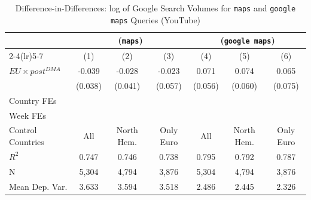 \documentclass[11pt]{article}
\begin{document}
	\begin{table}[!ht]
		\centering
		\def\sym#1{\ifmmode^{#1}\else\(^{#1}\)\fi}
		\caption{\label{tab:did_placebo} Difference-in-Differences: log of Google Search Volumes for \texttt{maps} and \texttt{google maps} Queries (YouTube)}
		\begin{threeparttable}
			\begin{tabular}{lcccccc}
				\hline \noalign{\smallskip} 
				& \multicolumn{3}{c}{(\texttt{maps})} & \multicolumn{3}{c}{(\texttt{google maps})}  \\ \cmidrule(lr){2-4}\cmidrule(lr){5-7}
				
				&         (1)   &         (2)   &         (3)   &         (4)   &         (5)   &         (6)   \\
				\midrule
				$ EU \times post^{DMA} $ &      -0.039   &      -0.028   &      -0.023   &       0.071   &       0.074   &       0.065   \\
				&     (0.038)   &     (0.041)   &     (0.057)   &     (0.056)   &     (0.060)   &     (0.075)   \\
				
				Country FEs         &  \checkmark   &  \checkmark   &  \checkmark   &  \checkmark   &  \checkmark   &  \checkmark   \\
				Week FEs            &  \checkmark   &  \checkmark   &  \checkmark   &  \checkmark   &  \checkmark   &  \checkmark   \\
				Control Countries   &         All   &  North Hem.   &   Only Euro   &         All   &  North Hem.   &   Only Euro   \\
				$ R ^2 $            &       0.747   &       0.746   &       0.738   &       0.795   &       0.792   &       0.787   \\
				N                   &       5,304   &       4,794   &       3,876   &       5,304   &       4,794   &       3,876   \\
				Mean Dep. Var.      &       3.633   &       3.594   &       3.518   &       2.486   &       2.445   &       2.326   \\
				\midrule
				
			\end{tabular}
			

\end{threeparttable}
\end{table}
\end{document}
